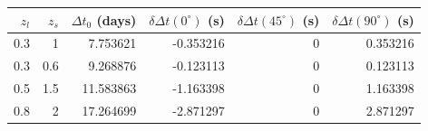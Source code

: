 \begin{tabular}{rrrrrr}
\toprule
$z_l$ & $z_s$ & $\Delta t_0$ (days) & $\delta\Delta t(0^\circ)$ (s) & $\delta\Delta t(45^\circ)$ (s) & $\delta\Delta t(90^\circ)$ (s)\\
\midrule
0.3 & 1 & 7.753621 & -0.353216 & 0 & 0.353216\\
0.3 & 0.6 & 9.268876 & -0.123113 & 0 & 0.123113\\
0.5 & 1.5 & 11.583863 & -1.163398 & 0 & 1.163398\\
0.8 & 2 & 17.264699 & -2.871297 & 0 & 2.871297\\
\bottomrule
\end{tabular}
